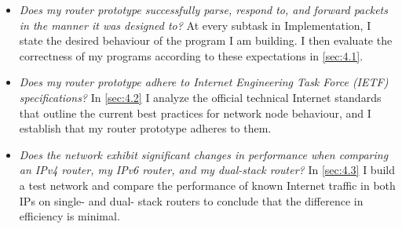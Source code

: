 \begin{itemize}[topsep=0pt]
\item \textit{Does my router prototype successfully parse, respond to, and forward packets in the manner it was designed to?} At every subtask in Implementation, I state the desired behaviour of the program I am building. I then evaluate the correctness of my programs according to these expectations in \cref{sec:4.1}.

\item \textit{Does my router prototype adhere to Internet Engineering Task Force (IETF) specifications?} In \cref{sec:4.2} I analyze the official technical Internet standards that outline the current best practices for network node behaviour, and I establish that my router prototype adheres to them.

\item \textit{Does the network exhibit significant changes in performance when comparing an IPv4 router, my IPv6 router, and my dual-stack router?} In \cref{sec:4.3} I build a test network and compare the performance of known Internet traffic in both IPs on single- and dual- stack routers to conclude that the difference in efficiency is minimal.

\end{itemize}